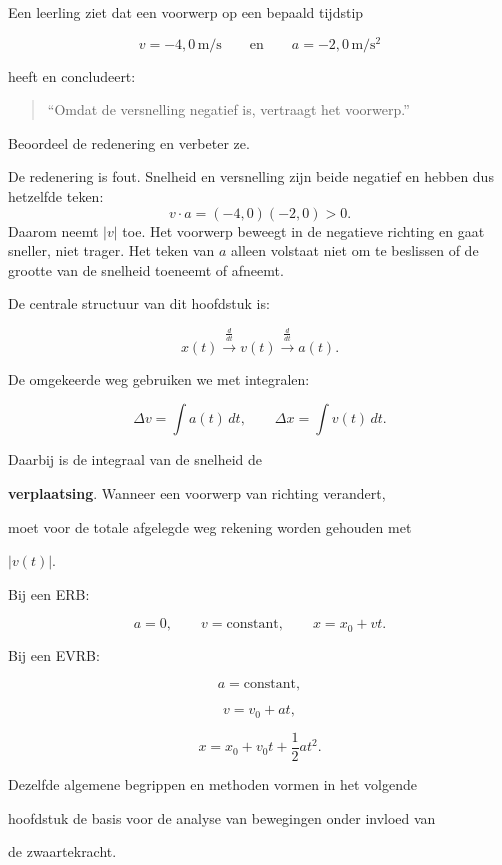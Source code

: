\documentclass{ximera}
\begin{document}
\begin{oefening}{\oefU\ESS}

Een leerling ziet dat een voorwerp op een bepaald tijdstip

\[v=-4,0\,\mathrm{m/s} \qquad\text{en}\qquad a=-2,0\,\mathrm{m/s^2}\]

heeft en concludeert:

\begin{quote}

``Omdat de versnelling negatief is, vertraagt het voorwerp.''

\end{quote}

Beoordeel de redenering en verbeter ze.

\begin{oplossing}
De redenering is fout. Snelheid en versnelling zijn beide negatief en hebben dus hetzelfde teken:
\[v\cdot a=(-4,0)(-2,0)>0.\]
Daarom neemt \(|v|\) toe. Het voorwerp beweegt in de negatieve richting en gaat sneller, niet trager. Het teken van \(a\) alleen volstaat niet om te beslissen of de grootte van de snelheid toeneemt of afneemt.
\end{oplossing}

\end{oefening}





De centrale structuur van dit hoofdstuk is:

\[\boxed{ x(t) \xrightarrow{\frac{d}{dt}} v(t) \xrightarrow{\frac{d}{dt}} a(t). }\]

De omgekeerde weg gebruiken we met integralen:

\[\boxed{ \Delta v = \int a(t)\,dt, \qquad \Delta x = \int v(t)\,dt. }\]

Daarbij is de integraal van de snelheid de

\textbf{verplaatsing}. Wanneer een voorwerp van richting verandert,

moet voor de totale afgelegde weg rekening worden gehouden met

$|v(t)|$.

Bij een ERB:

\[a=0, \qquad v=\text{constant}, \qquad x=x_0+vt.\]

Bij een EVRB:

\[a=\text{constant},\]

\[v=v_0+at,\]

\[x=x_0+v_0t+\frac12at^2.\]

Dezelfde algemene begrippen en methoden vormen in het volgende

hoofdstuk de basis voor de analyse van bewegingen onder invloed van

de zwaartekracht.
\end{document}

